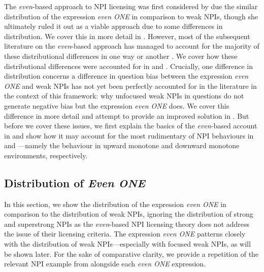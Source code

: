 The \textit{even}-based approach to NPI licensing was first considered by \textcite{Heim1984} due the similar distribution of the expression \textit{even \MakeUppercase{one}} in comparison to weak NPIs, though she ultimately ruled it out as a viable approach due to some differences in distribution. We cover this in more detail in . However, most of the subsequent literature on the \textit{even}-based approach has managed to account for the majority of these distributional differences in one way or another \parencite{Crnic2011,Crnic2014-dogma,Crnic2014-nm}. We cover how these distributional differences were accounted for in  and . Crucially, one difference in distribution concerns a difference in question bias between the expression \textit{even \MakeUppercase{one}} and weak NPIs has not yet been perfectly accounted for in the literature in the context of this framework: why unfocused weak NPIs in questions do not generate negative bias but the expression \textit{even ONE} does. We cover this difference in more detail and attempt to provide an improved solution in . But before we cover these issues, we first explain the basics of the \textit{even}-based account in  and show how it may account for the most rudimentary of NPI behaviours in  and ---namely the behaviour in upward monotone and downward monotone environments, respectively.

\subsection{Distribution of \textit{Even ONE}}
In this section, we show the distribution of the expression \textit{even \MakeUppercase{one}} in comparison to the distribution of weak NPIs, ignoring the distribution of strong and superstrong NPIs as the \textit{even}-based NPI licensing theory does not address the issue of their licensing criteria.
The expression \textit{even \MakeUppercase{one}} patterns closely with the distribution of weak NPIs---especially with focused weak NPIs, as will be shown later. For the sake of comparative clarity, we provide a repetition of the relevant NPI example from  alongside each \textit{even \MakeUppercase{one}} expression. 

